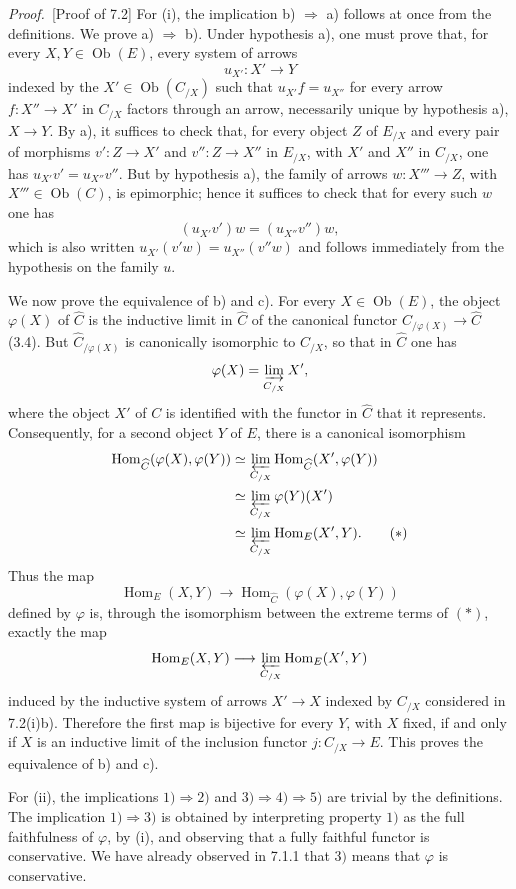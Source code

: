 \documentclass[11pt]{article}
\newcommand{\Ob}{\operatorname{Ob}}
\newcommand{\Hom}{\operatorname{Hom}}
\newenvironment{proofsketch}{\par\noindent\emph{Proof.}\ }{\par\medskip}
\begin{document}
\begin{proofsketch}[Proof of 7.2]
For (i), the implication b) $\Rightarrow$ a) follows at once from the definitions. We prove a) $\Rightarrow$ b). Under hypothesis a), one must prove that, for every $X,Y\in\Ob(E)$, every system of arrows
\[
u_{X'}:X'\longrightarrow Y
\]
indexed by the $X'\in\Ob(C_{/X})$ such that $u_{X'}f=u_{X''}$ for every arrow $f:X''\to X'$ in $C_{/X}$ factors through an arrow, necessarily unique by hypothesis a), $X\to Y$. By a), it suffices to check that, for every object $Z$ of $E_{/X}$ and every pair of morphisms $v':Z\to X'$ and $v'':Z\to X''$ in $E_{/X}$, with $X'$ and $X''$ in $C_{/X}$, one has $u_{X'}v'=u_{X''}v''$. But by hypothesis a), the family of arrows $w:X'''\to Z$, with $X'''\in\Ob(C)$, is epimorphic; hence it suffices to check that for every such $w$ one has
\[
(u_{X'}v')w=(u_{X''}v'')w,
\]
which is also written $u_{X'}(v'w)=u_{X''}(v''w)$ and follows immediately from the hypothesis on the family $u$.

We now prove the equivalence of b) and c). For every $X\in\Ob(E)$, the object $\varphi(X)$ of $\widehat C$ is the inductive limit in $\widehat C$ of the canonical functor $\widehat C_{/\varphi(X)}\to\widehat C$ (3.4). But $\widehat C_{/\varphi(X)}$ is canonically isomorphic to $C_{/X}$, so that in $\widehat C$ one has
\[
\varphi(X)=\varinjlim_{C_{/X}}X',
\]
where the object $X'$ of $C$ is identified with the functor in $\widehat C$ that it represents. Consequently, for a second object $Y$ of $E$, there is a canonical isomorphism
\begin{align*}
\Hom_{\widehat C}(\varphi(X),\varphi(Y))
&\simeq \varprojlim_{C_{/X}}\Hom_{\widehat C}(X',\varphi(Y))\\
&\simeq \varprojlim_{C_{/X}}\varphi(Y)(X')\\
&\simeq \varprojlim_{C_{/X}}\Hom_E(X',Y).\tag{$*$}
\end{align*}
Thus the map
\[
\Hom_E(X,Y)\longrightarrow\Hom_{\widehat C}(\varphi(X),\varphi(Y))
\]
defined by $\varphi$ is, through the isomorphism between the extreme terms of $(*)$, exactly the map
\[
\Hom_E(X,Y)\longrightarrow\varprojlim_{C_{/X}}\Hom_E(X',Y)
\]
induced by the inductive system of arrows $X'\to X$ indexed by $C_{/X}$ considered in 7.2(i)b). Therefore the first map is bijective for every $Y$, with $X$ fixed, if and only if $X$ is an inductive limit of the inclusion functor $j:C_{/X}\to E$. This proves the equivalence of b) and c).

For (ii), the implications $1)\Rightarrow2)$ and $3)\Rightarrow4)\Rightarrow5)$ are trivial by the definitions. The implication $1)\Rightarrow3)$ is obtained by interpreting property $1)$ as the full faithfulness of $\varphi$, by (i), and observing that a fully faithful functor is conservative. We have already observed in 7.1.1 that $3)$ means that $\varphi$ is conservative.


\end{proofsketch}
\end{document}
